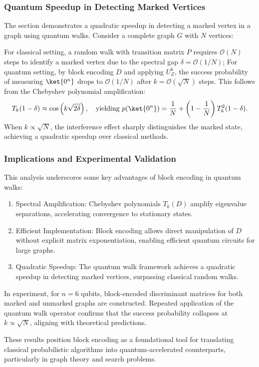 \documentclass{article}
\begin{document}
    \subsubsection{Quantum Speedup in Detecting Marked Vertices}
    The section demonstrates a quadratic speedup in detecting a marked vertex in a graph using quantum walks. Consider a complete graph $ G $ with $ N $ vertices:

    For classical setting, a random walk with transition matrix $ P $ requires $ \mathcal{O}(N) $ steps to identify a marked vertex due to the spectral gap $ \delta = \mathcal{O}(1/N) $; For quantum setting, by block encoding $ D $ and applying $ U_Z^k $, the success probability of measuring $ \ket{0^n} $ drops to $ \mathcal{O}(1/N) $ after $ k = \mathcal{O}(\sqrt{N}) $ steps. This follows from the Chebyshev polynomial amplification:
    \begin{equation}
        T_k(1 - \delta) \approx \cos\left(k \sqrt{2\delta}\right), \quad \text{yielding } p(\ket{0^n}) = \frac{1}{N} + \left(1 - \frac{1}{N}\right) T_k^2(1 - \delta).
    \end{equation}
    When $ k \propto \sqrt{N} $, the interference effect sharply distinguishes the marked state, achieving a quadratic speedup over classical methods.

    \subsubsection{Implications and Experimental Validation}

    This analysis underscores some key advantages of block encoding in quantum walks:

    \begin{enumerate}
        \item Spectral Amplification: Chebyshev polynomials $ T_k(D) $ amplify eigenvalue separations, accelerating convergence to stationary states.
        \item Efficient Implementation: Block encoding allows direct manipulation of $ D $ without explicit matrix exponentiation, enabling efficient quantum circuits for large graphs.
        \item Quadratic Speedup: The quantum walk framework achieves a quadratic speedup in detecting marked vertices, surpassing classical random walks.
    \end{enumerate}

    In experiment, for $ n = 6 $ qubits, block-encoded discriminant matrices for both marked and unmarked graphs are constructed. Repeated application of the quantum walk operator confirms that the success probability collapses at $ k \propto \sqrt{N} $, aligning with theoretical predictions.

    These results position block encoding as a foundational tool for translating classical probabilistic algorithms into quantum-accelerated counterparts, particularly in graph theory and search problems.

    
    
\end{document}
